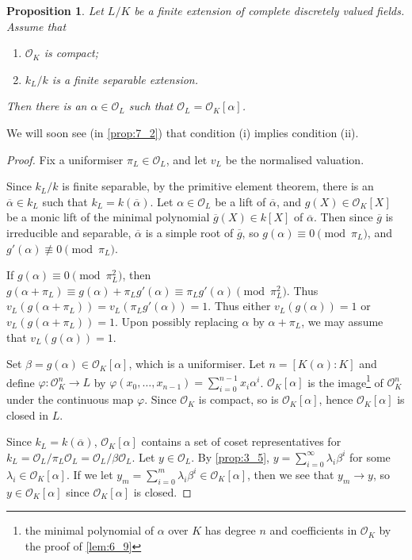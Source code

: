 \documentclass[11pt]{article}
\theoremstyle{definition}
\theoremstyle{plain}
\newtheorem{proposition}[definition]{Proposition}
\theoremstyle{remark}
\newcommand{\cO}{\mathcal{O}}
\begin{document}
\begin{proposition}\label{prop:6_12}
    Let $L/K$ be a finite extension of complete discretely valued fields. Assume that
    \begin{enumerate}
        \item $\cO_K$ is compact;
        \item $k_L / k$ is a finite separable extension.
    \end{enumerate}
Then there is an $\alpha \in \cO_L$ such that $\cO_L = \cO_K[\alpha]$.
\end{proposition}

\noindent We will soon see (in \autoref{prop:7_2}) that condition (i) implies condition (ii).

\begin{proof}
    Fix a uniformiser $\pi_L \in \cO_L$, and let $v_L$ be the normalised valuation.

    Since $k_L/k$ is finite separable, by the primitive element theorem, there is an $\overline{\alpha} \in k_L$ such that $k_L = k(\overline{\alpha})$. Let $\alpha \in \cO_L$ be a lift of $\overline{\alpha}$, and $g(X) \in \cO_K[X]$ be a monic lift of the minimal polynomial $\overline{g}(X) \in k[X]$ of $\overline{\alpha}$. Then since $\overline{g}$ is irreducible and separable, $\overline{\alpha}$ is a simple root of $\overline{g}$, so $g(\alpha) \equiv 0 \pmod{\pi_L}$, and $g'(\alpha) \not\equiv 0 \pmod{\pi_L}$.

    If $g(\alpha) \equiv 0 \pmod{\pi_L^2}$, then $g(\alpha + \pi_L) \equiv g(\alpha) + \pi_L g'(\alpha) \equiv \pi_L g'(\alpha) \pmod{\pi_L^2}$. Thus $v_L(g(\alpha + \pi_L)) = v_L(\pi_L g'(\alpha)) = 1$. Thus either $v_L(g(\alpha)) = 1$ or $v_L(g(\alpha + \pi_L)) = 1$. Upon possibly replacing $\alpha$ by $\alpha + \pi_L$, we may assume that $v_L(g(\alpha)) = 1$.

    Set $\beta = g(\alpha) \in \cO_K[\alpha]$, which is a uniformiser. Let $n = [K(\alpha) : K]$ and define $\varphi : \cO_K^n \to L$ by $\varphi(x_0, \ldots, x_{n-1}) = \sum_{i=0}^{n-1} x_i \alpha^i$. $\cO_K[\alpha]$ is the image\footnote{the minimal polynomial of $\alpha$ over $K$ has degree $n$ and coefficients in $\cO_K$ by the proof of \autoref{lem:6_9}} of $\cO_K^n$ under the continuous map $\varphi$. Since $\cO_K$ is compact, so is $\cO_K[\alpha]$, hence $\cO_K[\alpha]$ is closed in $L$.

    Since $k_L = k(\overline{\alpha})$, $\cO_K[\alpha]$ contains a set of coset representatives for $k_L = \cO_L / \pi_L \cO_L = \cO_L / \beta \cO_L$. Let $y \in \cO_L$. By \autoref{prop:3_5}, $y = \sum_{i=0}^\infty \lambda_i \beta^i$ for some $\lambda_i \in \cO_K[\alpha]$. If we let $y_m = \sum_{i=0}^m \lambda_i \beta^i \in \cO_K[\alpha]$, then we see that $y_m \to y$, so $y \in \cO_K[\alpha]$ since $\cO_K[\alpha]$ is closed.
\end{proof}
\end{document}
